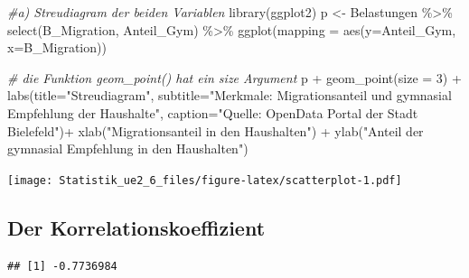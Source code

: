 \documentclass[
]{article}
\newenvironment{Shaded}{\begin{snugshade}}{\end{snugshade}}
\newcommand{\AttributeTok}[1]{\textcolor[rgb]{0.77,0.63,0.00}{#1}}
\newcommand{\CommentTok}[1]{\textcolor[rgb]{0.56,0.35,0.01}{\textit{#1}}}
\newcommand{\DecValTok}[1]{\textcolor[rgb]{0.00,0.00,0.81}{#1}}
\newcommand{\FunctionTok}[1]{\textcolor[rgb]{0.00,0.00,0.00}{#1}}
\newcommand{\NormalTok}[1]{#1}
\newcommand{\OtherTok}[1]{\textcolor[rgb]{0.56,0.35,0.01}{#1}}
\newcommand{\SpecialCharTok}[1]{\textcolor[rgb]{0.00,0.00,0.00}{#1}}
\newcommand{\StringTok}[1]{\textcolor[rgb]{0.31,0.60,0.02}{#1}}
\begin{document}
\begin{Shaded}
\begin{Highlighting}[]
\CommentTok{\#a) Streudiagram der beiden Variablen}
\FunctionTok{library}\NormalTok{(ggplot2)}
\NormalTok{p }\OtherTok{\textless{}{-}}\NormalTok{ Belastungen }\SpecialCharTok{\%\textgreater{}\%} 
  \FunctionTok{select}\NormalTok{(B\_Migration, Anteil\_Gym) }\SpecialCharTok{\%\textgreater{}\%} 
  \FunctionTok{ggplot}\NormalTok{(}\AttributeTok{mapping =} \FunctionTok{aes}\NormalTok{(}\AttributeTok{y=}\NormalTok{Anteil\_Gym, }
                       \AttributeTok{x=}\NormalTok{B\_Migration))}
  
\CommentTok{\# die Funktion geom\_point() hat ein size Argument}
\NormalTok{p }\SpecialCharTok{+} \FunctionTok{geom\_point}\NormalTok{(}\AttributeTok{size =} \DecValTok{3}\NormalTok{) }\SpecialCharTok{+} \FunctionTok{labs}\NormalTok{(}\AttributeTok{title=}\StringTok{"Streudiagram"}\NormalTok{,}
               \AttributeTok{subtitle=}\StringTok{"Merkmale: Migrationsanteil und gymnasial Empfehlung der Haushalte"}\NormalTok{,}
               \AttributeTok{caption=}\StringTok{"Quelle: OpenData Portal der Stadt Bielefeld"}\NormalTok{)}\SpecialCharTok{+}
  \FunctionTok{xlab}\NormalTok{(}\StringTok{"Migrationsanteil in den Haushalten"}\NormalTok{) }\SpecialCharTok{+}
  \FunctionTok{ylab}\NormalTok{(}\StringTok{"Anteil der gymnasial Empfehlung in den Haushalten"}\NormalTok{) }
\end{Highlighting}
\end{Shaded}

\texttt{[image: Statistik\_ue2\_6\_files/figure-latex/scatterplot-1.pdf]}

\hypertarget{der-korrelationskoeffizient}{%
\subsection{Der
Korrelationskoeffizient}\label{der-korrelationskoeffizient}}

\begin{Shaded}
\end{Shaded}

\begin{verbatim}
## [1] -0.7736984
\end{verbatim}
\end{document}
